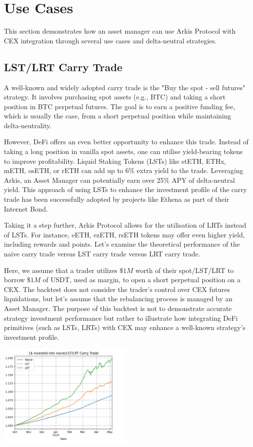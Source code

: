 \documentclass[conference]{IEEEtran}
\begin{document}
\section{Use Cases}

This section demonstrates how an asset manager can use Arkis Protocol with CEX integration through several use cases and delta-neutral strategies.

\subsection{LST/LRT Carry Trade}

A well-known and widely adopted carry trade is the "Buy the spot - sell futures" strategy. It involves purchasing spot assets (e.g., BTC) and taking a short position in BTC perpetual futures. The goal is to earn a positive funding fee, which is usually the case, from a short perpetual position while maintaining delta-neutrality.

However, DeFi offers an even better opportunity to enhance this trade. Instead of taking a long position in vanilla spot assets, one can utilise yield-bearing tokens to improve profitability. Liquid Staking Tokens (LSTs) like stETH, ETHx, mETH, osETH, or rETH can add up to 6$\%$ extra yield to the trade. Leveraging Arkis, an Asset Manager can potentially earn over 25$\%$ APY of delta-neutral yield. This approach of using LSTs to enhance the investment profile of the carry trade has been successfully adopted by projects like Ethena as part of their Internet Bond.

Taking it a step further, Arkis Protocol allows for the utilisation of LRTs instead of LSTs. For instance, eETH, ezETH, rsETH tokens may offer even higher yield, including rewards and points. Let's examine the theoretical performance of the naive carry trade versus LST carry trade versus LRT carry trade.

Here, we assume that a trader utilizes $\$1M$ worth of their spot/LST/LRT to borrow $\$1M$ of USDT, used as margin, to open a short perpetual position on a CEX. The backtest does not consider the trader's control over CEX futures liquidations, but let's assume that the rebalancing process is managed by an Asset Manager. The purpose of this backtest is not to demonstrate accurate strategy investment performance but rather to illustrate how integrating DeFi primitives (such as LSTs, LRTs) with CEX may enhance a well-known strategy's investment profile.

{
\centering
\includegraphics[width=0.5\textwidth]{images/carry_theoretical.png}
}
\end{document}
